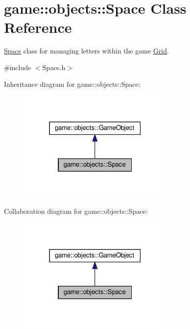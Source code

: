 \hypertarget{classgame_1_1objects_1_1Space}{}\section{game\+:\+:objects\+:\+:Space Class Reference}
\label{classgame_1_1objects_1_1Space}


\hyperlink{classgame_1_1objects_1_1Space}{Space} class for managing letters within the game \hyperlink{classgame_1_1objects_1_1Grid}{Grid}.  




{\ttfamily \#include $<$Space.\+h$>$}



Inheritance diagram for game\+:\+:objects\+:\+:Space\+:\nopagebreak
\begin{figure}[H]
\begin{center}
\leavevmode
\includegraphics[width=219pt]{classgame_1_1objects_1_1Space__inherit__graph}
\end{center}
\end{figure}


Collaboration diagram for game\+:\+:objects\+:\+:Space\+:\nopagebreak
\begin{figure}[H]
\begin{center}
\leavevmode
\includegraphics[width=219pt]{classgame_1_1objects_1_1Space__coll__graph}
\end{center}
\end{figure}
